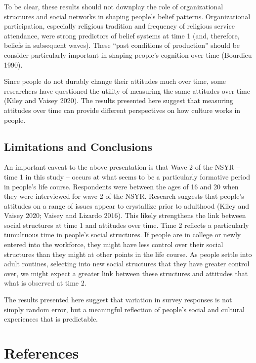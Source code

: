 \documentclass[12pt,]{article}
\begin{document}
To be clear, these results should not downplay the role of organizational structures and social networks in shaping people's belief patterns. Organizational participation, especially religious tradition and frequency of religious service attendance, were strong predictors of belief systems at time 1 (and, therefore, beliefs in subsequent waves). These ``past conditions of production'' should be consider particularly important in shaping people's cognition over time (Bourdieu 1990).

Since people do not durably change their attitudes much over time, some researchers have questioned the utility of measuring the same attitudes over time (Kiley and Vaisey 2020). The results presented here suggest that measuring attitudes over time can provide different perspectives on how culture works in people.

\hypertarget{limitations-and-conclusions}{%
\subsection{Limitations and Conclusions}\label{limitations-and-conclusions}}

An important caveat to the above presentation is that Wave 2 of the NSYR -- time 1 in this study -- occurs at what seems to be a particularly formative period in people's life course. Respondents were between the ages of 16 and 20 when they were interviewed for wave 2 of the NSYR. Research suggests that people's attitudes on a range of issues appear to crystallize prior to adulthood (Kiley and Vaisey 2020; Vaisey and Lizardo 2016). This likely strengthens the link between social structures at time 1 and attitudes over time. Time 2 reflects a particularly tumultuous time in people's social structures. If people are in college or newly entered into the workforce, they might have less control over their social structures than they might at other points in the life course. As people settle into adult routines, selecting into new social structures that they have greater control over, we might expect a greater link between these structures and attitudes that what is observed at time 2.

The results presented here suggest that variation in survey responses is not simply random error, but a meaningful reflection of people's social and cultural experiences that is predictable.

\newpage

\hypertarget{references}{%
\section{References}\label{references}}
\end{document}
